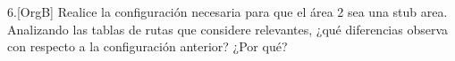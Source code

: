 \begin{ejer}
6.[OrgB]  Realice la configuración necesaria para que el área 2 sea una stub area. Analizando las tablas de rutas que considere relevantes, ¿qué diferencias observa con respecto a la configuración anterior? ¿Por qué?
\end{ejer}
